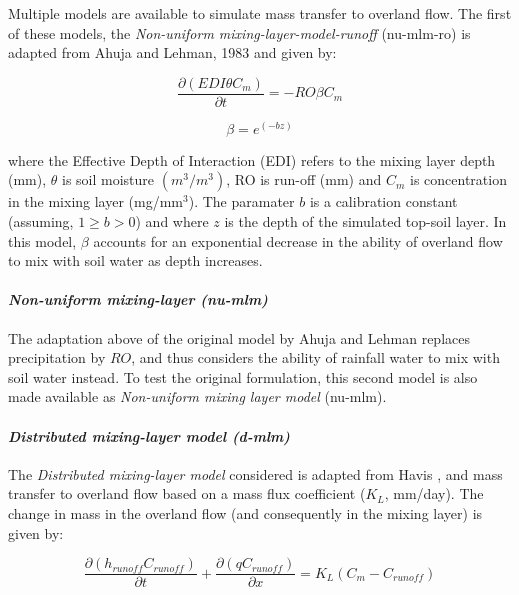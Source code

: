 \documentclass[]{article}
\let\oldparagraph\paragraph
\renewcommand{\paragraph}[1]{\oldparagraph{#1}\mbox{}}
\begin{document}
Multiple models are available to simulate mass transfer to overland
flow. The first of these models, the
\textit{Non-uniform mixing-layer-model-runoff} (nu-mlm-ro) is adapted
from Ahuja and Lehman, 1983 \citep[see][eq. 1 and p.~1217]{Shi2011} and
given by:

\begin{equation}
\frac{\partial (EDI \theta C_m)}{\partial t} = -RO \beta C_m
\label{eq:nu-mlm-ro}
\end{equation}

\begin{equation}
\beta = e^{(-bz)}
\label{eq:beta-nu-mlm}
\end{equation}

where the Effective Depth of Interaction (EDI) refers to the mixing
layer depth (mm), \(\theta\) is soil moisture \((m^3/m^3)\), RO is
run-off (mm) and \(C_m\) is concentration in the mixing layer
(mg/mm\(^3\)). The paramater \(b\) is a calibration constant (assuming,
\(1 \ge b > 0\)) and where \(z\) is the depth of the simulated top-soil
layer. In this model, \(\beta\) accounts for an exponential decrease in
the ability of overland flow to mix with soil water as depth increases.

\paragraph{\texorpdfstring{\textit{Non-uniform mixing-layer (nu-mlm)}}{}}\label{section-1}

The adaptation above of the original model by Ahuja and Lehman replaces
precipitation by \(RO\), and thus considers the ability of rainfall
water to mix with soil water instead. To test the original formulation,
this second model is also made available as
\textit{Non-uniform mixing layer model} (nu-mlm).

\paragraph{\texorpdfstring{\textit{Distributed mixing-layer model (d-mlm)}}{}}\label{section-2}

The \textit{Distributed mixing-layer model} considered is adapted from
Havis \citeyearpar{Havis1992}, and mass transfer to overland flow based
on a mass flux coefficient (\(K_L\), mm/day). The change in mass in the
overland flow (and consequently in the mixing layer) is given by:

\begin{equation}
\frac{\partial (h_{runoff} C_{runoff}) }{\partial t} + \frac{\partial(qC_{runoff}) }{\partial x} = K_L (C_m - C_{runoff})
\label{eq:d-mlm-of}
\end{equation}
\end{document}
